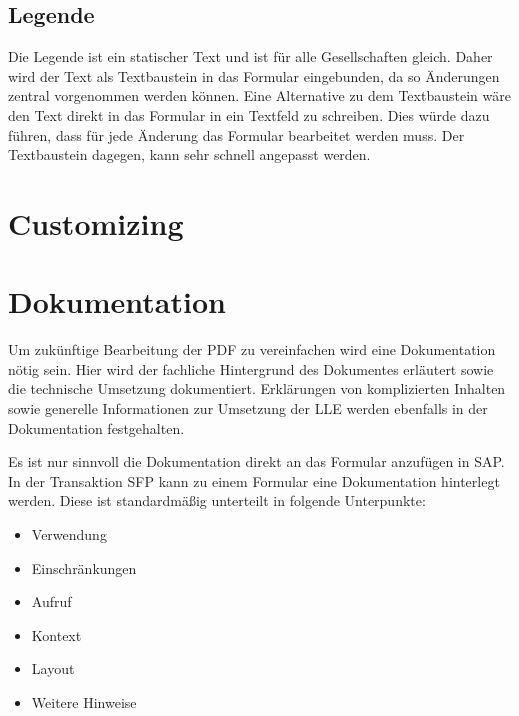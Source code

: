 \subsection{Legende}

Die Legende ist ein statischer Text und ist für alle Gesellschaften gleich. Daher wird der Text als Textbaustein in das Formular eingebunden, da so Änderungen zentral vorgenommen werden können. Eine Alternative zu dem Textbaustein wäre den Text direkt in das Formular in ein Textfeld zu schreiben. Dies würde dazu führen, dass für jede Änderung das Formular bearbeitet werden muss. Der Textbaustein dagegen, kann sehr schnell angepasst werden.



\section{Customizing}





\section{Dokumentation}

Um zukünftige Bearbeitung der PDF zu vereinfachen wird eine Dokumentation nötig sein. Hier wird der fachliche Hintergrund des Dokumentes erläutert sowie die technische Umsetzung dokumentiert. Erklärungen von komplizierten Inhalten sowie generelle Informationen zur Umsetzung der \ac{LLE} werden ebenfalls in der Dokumentation festgehalten. 

Es ist nur sinnvoll die Dokumentation direkt an das Formular anzufügen in SAP. In der Transaktion SFP kann zu einem Formular eine Dokumentation hinterlegt werden. Diese ist standardmäßig unterteilt in folgende Unterpunkte:

\begin{itemize}
	\item Verwendung
	\item Einschränkungen
	\item Aufruf
	\item Kontext
	\item Layout
	\item Weitere Hinweise
	
\end{itemize}

